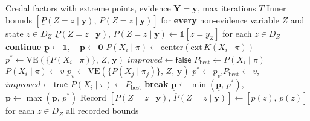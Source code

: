 \documentclass[11pt]{article}
\begin{document}
\begin{algorithm}[H]
\caption{ApproxLP: Coordinate Descent over Extreme Points (All Non-Evidence Variables)}
\label{alg:approxlp}
\begin{algorithmic}[1]
\Require Credal factors with extreme points, evidence $\mathbf{Y}{=}\mathbf{y}$,
         max iterations $T$
\Ensure Inner bounds $[\underline{P}(Z{=}z \mid \mathbf{y}),\, \overline{P}(Z{=}z \mid \mathbf{y})]$
        for \textbf{every} non-evidence variable $Z$ and state $z \in D_Z$
\Statex
{}
    \State $\underline{P}(Z{=}z \mid \mathbf{y}),\, \overline{P}(Z{=}z \mid \mathbf{y})
           \gets \mathbb{1}[z = y_Z]$ for each $z \in D_Z$
    \State \textbf{continue}
  \EndIf
  \State $\underline{\mathbf{p}} \gets \mathbf{1},\quad \overline{\mathbf{p}} \gets \mathbf{0}$
    \Statex \hspace{1.5em}
      \State $P(X_i \mid \pi) \gets \mathrm{center}(\mathrm{ext}\,K(X_i \mid \pi))$
    \EndFor
    \State $p^* \gets \mathrm{VE}(\{P(X_i \mid \pi)\},\, Z,\, \mathbf{y})$
    \Statex \hspace{1.5em}
      \State $\mathit{improved} \gets \mathsf{false}$
        \State $P_{\mathrm{best}} \gets P(X_i \mid \pi)$
          \State $P(X_i \mid \pi) \gets v$
          \State $p_v \gets \mathrm{VE}(\{P(X_j \mid \pi_j)\},\, Z,\, \mathbf{y})$
          \If{$[\mathrm{sense}{=}\min \wedge p_v(z){<}p^*(z)] \vee
               [\mathrm{sense}{=}\max \wedge p_v(z){>}p^*(z)]$}
            \State $p^* \gets p_v$,\quad $P_{\mathrm{best}} \gets v$,\quad
                   $\mathit{improved} \gets \mathsf{true}$
          \EndIf
        \EndFor
        \State $P(X_i \mid \pi) \gets P_{\mathrm{best}}$
      \EndFor
       \textbf{break} 
      \EndIf
    \EndFor
    \State $\underline{\mathbf{p}} \gets \min(\underline{\mathbf{p}},\, p^*)$,\quad
           $\overline{\mathbf{p}} \gets \max(\overline{\mathbf{p}},\, p^*)$
  \EndFor
  \State Record $[\underline{P}(Z{=}z \mid \mathbf{y}),\, \overline{P}(Z{=}z \mid \mathbf{y})]
         \gets [\underline{p}(z),\, \overline{p}(z)]$ for each $z \in D_Z$
\EndFor
\State \Return all recorded bounds
\end{algorithmic}
\end{algorithm}
\end{document}
